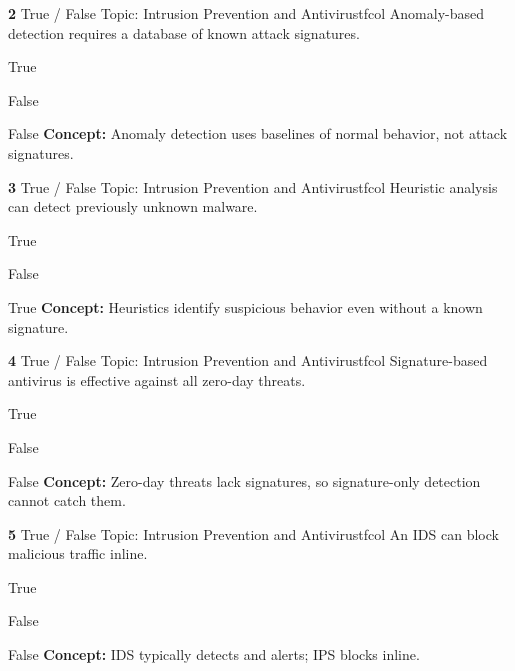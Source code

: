 \documentclass[10pt,a4paper]{article}
\begin{document}
\begin{qcard}{\color{white}\textbf{2} \hfill \small True / False \textbar{} Topic: Intrusion Prevention and Antivirus}{tfcol}
Anomaly-based detection requires a database of known attack signatures.

\begin{qoptions}
\item True
\item False
\end{qoptions}
\begin{explainbox}{False}
\textbf{Concept:} Anomaly detection uses baselines of normal behavior, not attack signatures.
\end{explainbox}
\end{qcard}

\begin{qcard}{\color{white}\textbf{3} \hfill \small True / False \textbar{} Topic: Intrusion Prevention and Antivirus}{tfcol}
Heuristic analysis can detect previously unknown malware.

\begin{qoptions}
\item True
\item False
\end{qoptions}
\begin{explainbox}{True}
\textbf{Concept:} Heuristics identify suspicious behavior even without a known signature.
\end{explainbox}
\end{qcard}

\begin{qcard}{\color{white}\textbf{4} \hfill \small True / False \textbar{} Topic: Intrusion Prevention and Antivirus}{tfcol}
Signature-based antivirus is effective against all zero-day threats.

\begin{qoptions}
\item True
\item False
\end{qoptions}
\begin{explainbox}{False}
\textbf{Concept:} Zero-day threats lack signatures, so signature-only detection cannot catch them.
\end{explainbox}
\end{qcard}

\begin{qcard}{\color{white}\textbf{5} \hfill \small True / False \textbar{} Topic: Intrusion Prevention and Antivirus}{tfcol}
An IDS can block malicious traffic inline.

\begin{qoptions}
\item True
\item False
\end{qoptions}
\begin{explainbox}{False}
\textbf{Concept:} IDS typically detects and alerts; IPS blocks inline.
\end{explainbox}
\end{qcard}
\end{document}
